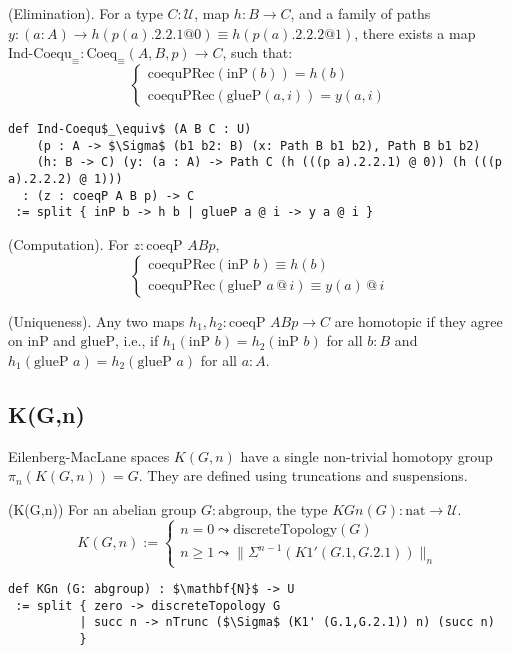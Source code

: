 \begin{theorem} (Elimination).
For a type \( C : \mathcal{U} \), map \( h : B \to C \),
and a family of paths \( y : (a : A) \to h(p(a).2.2.1  @ 0) \equiv h(p(a).2.2.2 @ 1) \),
there exists a map \( \text{Ind-Coequ}_\equiv : \text{Coeq}_\equiv(A,B,p) \to C \), such that:
\[
\begin{cases}
\text{coequPRec}(\text{inP}(b)) = h(b) \\
\text{coequPRec}(\text{glueP}(a,i)) = y(a,i)
\end{cases}
\]
\begin{lstlisting}[mathescape=true]
def Ind-Coequ$_\equiv$ (A B C : U)
    (p : A -> $\Sigma$ (b1 b2: B) (x: Path B b1 b2), Path B b1 b2)
    (h: B -> C) (y: (a : A) -> Path C (h (((p a).2.2.1) @ 0)) (h (((p a).2.2.2) @ 1)))
  : (z : coeqP A B p) -> C
 := split { inP b -> h b | glueP a @ i -> y a @ i }
\end{lstlisting}
\end{theorem}

\begin{theorem} (Computation).
For \( z : \text{coeqP } A B p \),
\[
\begin{cases}
\text{coequPRec}(\text{inP } b) \equiv h(b) \\
\text{coequPRec}(\text{glueP } a \, @ \, i) \equiv y(a) \, @ \, i
\end{cases}
\]
\end{theorem}

\begin{theorem} (Uniqueness).
Any two maps \( h_1, h_2 : \text{coeqP } A B p \to C \) are homotopic
if they agree on \( \text{inP} \) and \( \text{glueP} \), i.e.,
if \( h_1(\text{inP } b) = h_2(\text{inP } b) \) for all \( b : B \)
and \( h_1(\text{glueP } a) = h_2(\text{glueP } a) \) for all \( a : A \).
\end{theorem}

\newpage
\subsection{K(G,n)}
Eilenberg-MacLane spaces \( K(G,n) \) have a single non-trivial
homotopy group \( \pi_n(K(G,n)) = G \). They are defined using truncations and suspensions.

\begin{definition} (K(G,n))
For an abelian group \( G : \text{abgroup} \), the type \( KGn(G) : \text{nat} \to \mathcal{U} \).
\[
K(G,n) :=
\begin{cases}
n = 0 \leadsto \text{discreteTopology}(G) \\
n \geq 1 \leadsto \|\Sigma^{n-1}(K1'(G.1,G.2.1))\|_{n}
\end{cases}
\]
\begin{lstlisting}[mathescape=true]
def KGn (G: abgroup) : $\mathbf{N}$ -> U
 := split { zero -> discreteTopology G
          | succ n -> nTrunc ($\Sigma$ (K1' (G.1,G.2.1)) n) (succ n)
          }
\end{lstlisting}
\end{definition}

